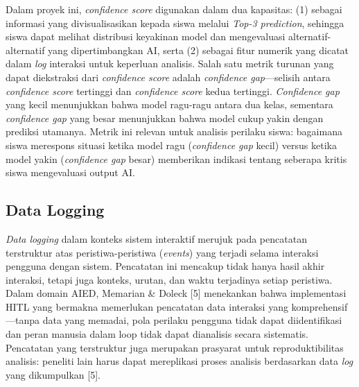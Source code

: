 \documentclass[10pt,twoside,openright]{report}
\begin{document}
Dalam proyek ini, \textit{confidence score} digunakan dalam dua kapasitas: (1) sebagai informasi yang divisualisasikan kepada siswa melalui \textit{Top-3 prediction}, sehingga siswa dapat melihat distribusi keyakinan model dan mengevaluasi alternatif-alternatif yang dipertimbangkan AI, serta (2) sebagai fitur numerik yang dicatat dalam \textit{log} interaksi untuk keperluan analisis. Salah satu metrik turunan yang dapat diekstraksi dari \textit{confidence score} adalah \textit{confidence gap}—selisih antara \textit{confidence score} tertinggi dan \textit{confidence score} kedua tertinggi. \textit{Confidence gap} yang kecil menunjukkan bahwa model ragu-ragu antara dua kelas, sementara \textit{confidence gap} yang besar menunjukkan bahwa model cukup yakin dengan prediksi utamanya. Metrik ini relevan untuk analisis perilaku siswa: bagaimana siswa merespons situasi ketika model ragu (\textit{confidence gap} kecil) versus ketika model yakin (\textit{confidence gap} besar) memberikan indikasi tentang seberapa kritis siswa mengevaluasi output AI.

\subsection{Data Logging}
\label{subsec:data-logging}

\textit{Data logging} dalam konteks sistem interaktif merujuk pada pencatatan terstruktur atas peristiwa-peristiwa (\textit{events}) yang terjadi selama interaksi pengguna dengan sistem. Pencatatan ini mencakup tidak hanya hasil akhir interaksi, tetapi juga konteks, urutan, dan waktu terjadinya setiap peristiwa. Dalam domain AIED, Memarian \& Doleck [5] menekankan bahwa implementasi HITL yang bermakna memerlukan pencatatan data interaksi yang komprehensif—tanpa data yang memadai, pola perilaku pengguna tidak dapat diidentifikasi dan peran manusia dalam loop tidak dapat dianalisis secara sistematis. Pencatatan yang terstruktur juga merupakan prasyarat untuk reproduktibilitas analisis: peneliti lain harus dapat mereplikasi proses analisis berdasarkan data \textit{log} yang dikumpulkan [5].
\end{document}
